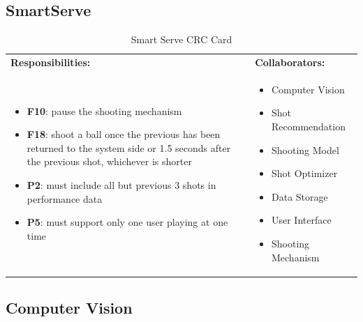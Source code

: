 \documentclass[11pt]{article}
\begin{document}
\subsection{SmartServe}

\begin{table}[H]
\centering
\label{my-label}
\begin{tabular}{ | >{\raggedright\arraybackslash}p{} | >{\raggedright\arraybackslash}p{} | }
\hline
\multicolumn{2}{|c|}{\textbf{Smart Serve}}             \\ \hline
\textbf{Responsibilities:} & \textbf{Collaborators:} \\ \hline
\begin{itemize}
\item \textbf{F10}: pause the shooting mechanism
\item \textbf{F18}: shoot a ball once the previous has been returned to the system side or 1.5 seconds after the previous shot, whichever is shorter
\item \textbf{P2}:  must include all but previous 3 shots in performance data
\item \textbf{P5}: must support only one user playing at one time
\end{itemize}
&
\begin{itemize}
\item Computer Vision
\item Shot Recommendation
\item Shooting Model
\item Shot Optimizer
\item Data Storage
\item User Interface
\item Shooting Mechanism
\end{itemize} \\ \hline
\end{tabular}
\caption{Smart Serve CRC Card}
\end{table}

\subsection{Computer Vision}
\end{document}
